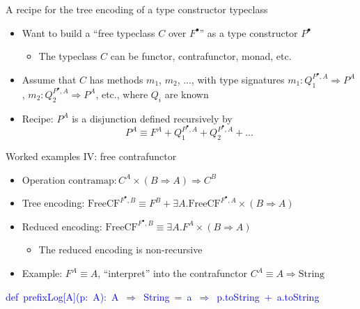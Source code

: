 \documentclass[english,,russian]{beamer}
\newenvironment{lyxcode}
  {\par\begin{list}{}{
    \setlength{\rightmargin}{\leftmargin}
    \setlength{\listparindent}{0pt}%
    \raggedright
    \setlength{\itemsep}{0pt}
    \setlength{\parsep}{0pt}
    \normalfont\ttfamily}%
   \def\{{\char`\{}
   \def\}{\char`\}}
   \def\textasciitilde{\char`\~}
   \item[]}
  {\end{list}}
\begin{document}
\begin{frame}{A recipe for the tree encoding of a type constructor typeclass}
\begin{itemize}
\item Want to build a ``free typeclass $C$ over $F^{\bullet}$'' as a
type constructor $P^{\bullet}$ 
\begin{itemize}
\item The typeclass $C$ can be functor, contrafunctor, monad, etc.
\end{itemize}
\item Assume that $C$ has methods $m_{1}$, $m_{2}$, ..., with type signatures
$m_{1}:Q_{1}^{P^{\bullet},A}\Rightarrow P^{A}$, $m_{2}:Q_{2}^{P^{\bullet},A}\Rightarrow P^{A}$,
etc., where $Q_{i}$ are known
\item Recipe: $P^{A}$ is a disjunction defined recursively by
\[
P^{A}\equiv F^{A}+Q_{1}^{P^{\bullet},A}+Q_{2}^{P^{\bullet},A}+...
\]
\end{itemize}
\end{frame}

\begin{frame}{Worked examples IV: free contrafunctor}
\begin{itemize}
\item Operation $\text{contramap}:C^{A}\times\left(B\Rightarrow A\right)\Rightarrow C^{B}$ 
\item Tree encoding: $\text{FreeCF}^{F^{\bullet},B}\equiv F^{B}+\exists A.\text{FreeCF}^{F^{\bullet},A}\times\left(B\Rightarrow A\right)$
\item Reduced encoding: $\text{FreeCF}^{F^{\bullet},B}\equiv\exists A.F^{A}\times\left(B\Rightarrow A\right)$
\begin{itemize}
\item The reduced encoding is non-recursive
\end{itemize}
\item Example: $F^{A}\equiv A$, ``interpret'' into the contrafunctor
$C^{A}\equiv A\Rightarrow\text{String}$
\end{itemize}
\begin{lyxcode}
{\footnotesize{}\vspace{-0.35cm}}\textcolor{blue}{\footnotesize{}def~prefixLog{[}A{]}(p:~A):~A~$\Rightarrow$~String~=~a~$\Rightarrow$~p.toString~+~a.toString}{\footnotesize\par}
\end{lyxcode}
\end{frame}
\end{document}

